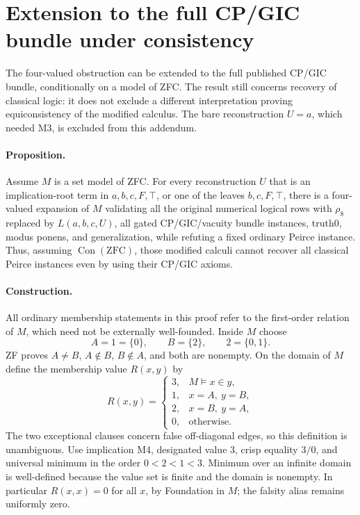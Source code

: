 \section{Extension to the full CP/GIC bundle under consistency}
\label{sec:colored-model-addendum}

The four-valued obstruction can be extended to the full published
CP/GIC bundle, conditionally on a model of ZFC.  The result still
concerns recovery of classical logic: it does not exclude a different
interpretation proving equiconsistency of the modified calculus.
The bare reconstruction $U=a$, which needed M3, is excluded from this
addendum.

\paragraph{Proposition.}
Assume $M$ is a set model of ZFC.  For every reconstruction $U$ that
is an implication-root term in $a,b,c,F,\top$, or one of the leaves
$b,c,F,\top$, there is a four-valued expansion of $M$ validating all
the original numerical logical rows with $\rho_8$ replaced by
$L(a,b,c,U)$, all gated CP/GIC/vacuity bundle instances, truth0,
modus ponens, and generalization, while refuting a fixed ordinary
Peirce instance.  Thus, assuming $\operatorname{Con}(\mathrm{ZFC})$,
those modified calculi cannot recover all classical Peirce instances
even by using their CP/GIC axioms.

\paragraph{Construction.}
All ordinary membership statements in this proof refer to the
first-order relation of $M$, which need not be externally
well-founded.  Inside $M$ choose
\[
 A=1=\{0\},\qquad B=\{2\},\qquad 2=\{0,1\}.
\]
ZF proves $A\ne B$, $A\notin B$, $B\notin A$, and both are nonempty.
On the domain of $M$ define the membership value $R(x,y)$ by
\[
 R(x,y)=
 \begin{cases}
 3,&M\models x\in y,\\
 1,&x=A,\ y=B,\\
 2,&x=B,\ y=A,\\
 0,&\text{otherwise}.
 \end{cases}
\]
The two exceptional clauses concern false off-diagonal edges, so this
definition is unambiguous.  Use implication M4, designated value $3$,
crisp equality $3/0$, and universal minimum in the order $0<2<1<3$.
Minimum over an infinite domain is well-defined because the value set
is finite and the domain is nonempty.  In particular $R(x,x)=0$ for
all $x$, by Foundation in $M$; the falsity alias remains uniformly zero.

